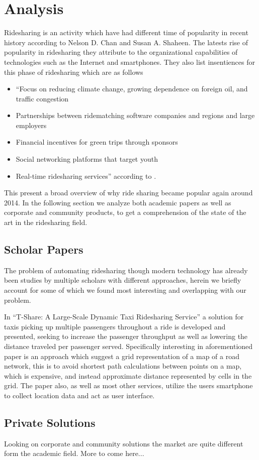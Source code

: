 \section{Analysis}
Ridesharing is an activity which have had different time of popularity in recent history according to Nelson D. Chan and Susan A. Shaheen\cite{doi:10.1080/01441647.2011.621557}.
The latests rise of popularity in ridesharing they attribute to the organizational capabilities of technologies such as the Internet and smartphones.
They also list insentiences for this phase of ridesharing which are as follows 
\begin{itemize}
  \item ``Focus on reducing climate change, growing dependence on foreign oil, and traffic congestion
  \item Partnerships between ridematching software companies and regions and large employers
  \item Financial incentives for green trips through sponsors
  \item Social networking platforms that target youth
  \item Real-time ridesharing services'' according to \cite{doi:10.1080/01441647.2011.621557}.
\end{itemize}

This present a broad overview of why ride sharing became popular again around 2014.
In the following section we analyze both academic papers as well as corporate and community products, to get a comprehension of the state of the art in the ridesharing field.

\subsection{Scholar Papers}
The problem of automating ridesharing though modern technology has already been studies by multiple scholars with different approaches, herein we briefly account for some of which we found most interesting and overlapping with our problem. 

In ``T-Share: A Large-Scale Dynamic Taxi Ridesharing Service'' \cite{ShuoMa2013} a solution for taxis picking up multiple passengers throughout a ride is developed and presented, seeking to increase the passenger throughput as well as lowering the distance traveled per passenger served.
Specifically interesting in aforementioned paper is an approach which suggest a grid representation of a map of a road network, this is to avoid shortest path calculations between points on a map, which is expensive, and instead approximate distance represented by cells in the grid.
The paper also, as well as most other services, utilize the users smartphone to collect location data and act as user interface.


\subsection{Private Solutions}
Looking on corporate and community solutions the market are quite different form the academic field. 
More to come here...